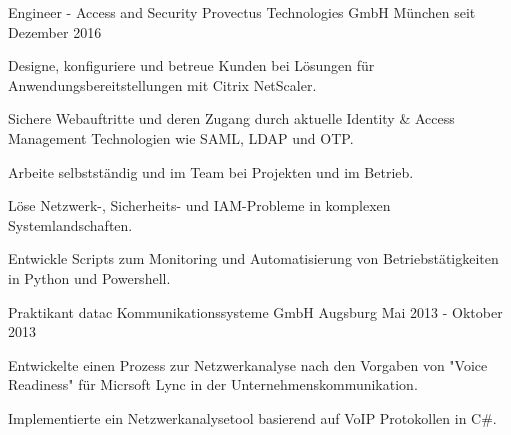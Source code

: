 


\begin{cventries}



\cventry
{Engineer - Access and Security} %
{Provectus Technologies GmbH} %
{München} %
{seit Dezember 2016} %
{ %
\begin{cvitems}
\item {Designe, konfiguriere und betreue Kunden bei Lösungen für Anwendungsbereitstellungen mit Citrix NetScaler.}
\item {Sichere Webauftritte und deren Zugang durch aktuelle Identity \& Access Management Technologien wie SAML, LDAP und OTP.}
\item {Arbeite selbstständig und im Team bei Projekten und im Betrieb.}
\item {Löse Netzwerk-, Sicherheits- und IAM-Probleme in komplexen Systemlandschaften.}
\item {Entwickle Scripts zum Monitoring und Automatisierung von Betriebstätigkeiten in Python und Powershell.}
\end{cvitems}
}


\cventry
{Praktikant} %
{datac Kommunikationssysteme GmbH} %
{Augsburg} %
{Mai 2013 - Oktober 2013} %
{ %
\begin{cvitems}
\item {Entwickelte einen Prozess zur Netzwerkanalyse nach den Vorgaben von "Voice Readiness" für Micrsoft Lync in der Unternehmenskommunikation.}
\item {Implementierte ein Netzwerkanalysetool basierend auf VoIP Protokollen in C\#.}
\end{cvitems}
}


\end{cventries}
